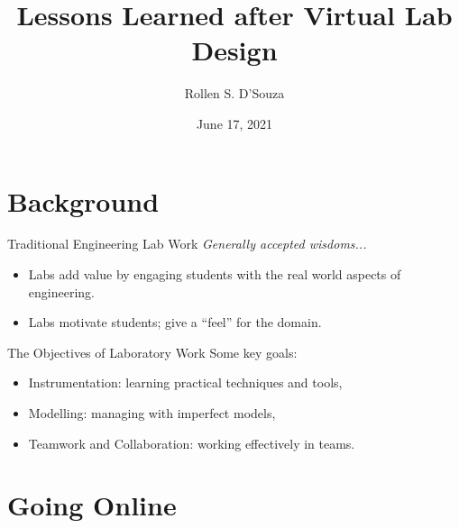 \documentclass{beamer}
\title[Lessons Learned after Virtual Lab Design]{%
  Lessons Learned after Virtual Lab Design
}
\author[R. S. D'Souza --- rollen.dsouza@uwaterloo.ca]{%
  Rollen S. D'Souza
}
\date{June 17, 2021}
\begin{document}
\frame{\titlepage}

\section{Background}

\begin{frame}{Traditional Engineering Lab Work}
  \emph{Generally accepted wisdoms...}
  \begin{itemize}
    \item{
      Labs add value by engaging students with the real world aspects of engineering.
    }
    \pause
    \item{
      Labs motivate students; give a ``feel'' for the domain.
    }
  \end{itemize}
\end{frame}

\begin{frame}{The Objectives of Laboratory Work}
  Some key goals:~\cite{Feisel2005}
  \begin{itemize}
    \item{
      Instrumentation: learning practical techniques and tools,
    } \pause
    \item{
      Modelling: managing with imperfect models,
    } \pause
    \item{
      Teamwork and Collaboration: working effectively in teams.
    }
  \end{itemize}
\end{frame}

\section{Going Online}

\end{document}
